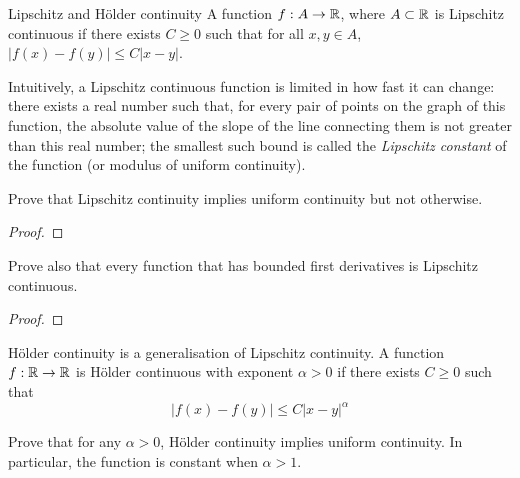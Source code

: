 \documentclass[11pt]{article}
\begin{document}
\begin{extension}{Lipschitz and Hölder continuity}
  A function \(f:A\to\mathbb{R}\), where \(A\subset\mathbb{R}\) is Lipschitz continuous if there exists \(C\geq 0\) such that for all \(x,y\in A\), \(|f(x)-f(y)|\leq C|x-y|\).

  \vspace{5pt}Intuitively, a Lipschitz continuous function is limited in how fast it can change: there exists a real number such that, for every pair of points on the graph of this function, the absolute value of the slope of the line connecting them is not greater than this real number; the smallest such bound is called the \emph{Lipschitz constant} of the function (or modulus of uniform continuity).

  \vspace{5pt}Prove that Lipschitz continuity implies uniform continuity but not otherwise. 
  \begin{proof}
    
  \end{proof}

  Prove also that every function that has bounded first derivatives is Lipschitz continuous.
  \begin{proof}
    
  \end{proof}

  Hölder continuity is a generalisation of Lipschitz continuity. A function \(f:\mathbb{R}\to\mathbb{R}\) is Hölder continuous with exponent \(\alpha>0\) if there exists \(C\geq 0\) such that \[|f(x)-f(y)|\leq C|x-y|^\alpha\]

  Prove that for any \(\alpha>0\), Hölder continuity implies uniform continuity. In particular, the function is constant when \(\alpha >1\).
\end{extension}
\end{document}
